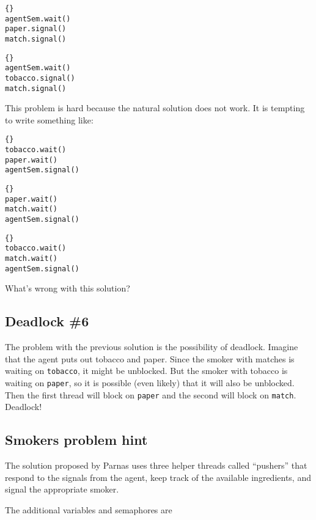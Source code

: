 \documentclass{book}
\newcommand{\clearemptydoublepage}{\newpage\cleardoublepage}
\begin{document}
\begin{lstlisting}[title={Agent B code}]{}
agentSem.wait()
paper.signal()
match.signal()
\end{lstlisting}

\begin{lstlisting}[title={Agent C code}]{}
agentSem.wait()
tobacco.signal()
match.signal()
\end{lstlisting}

This problem is hard because the natural solution does not
work.  It is tempting to write something like:

\begin{lstlisting}[title={Smoker with matches}]{}
tobacco.wait()
paper.wait()
agentSem.signal()
\end{lstlisting}

\begin{lstlisting}[title={Smoker with tobacco}]{}
paper.wait()
match.wait()
agentSem.signal()
\end{lstlisting}

\begin{lstlisting}[title={Smoker with paper}]{}
tobacco.wait()
match.wait()
agentSem.signal()
\end{lstlisting}

What's wrong with this solution?

\clearemptydoublepage
\subsection{Deadlock \#6}

The problem with the previous solution is the possibility
of deadlock.  Imagine that the agent puts out tobacco and
paper.  Since the smoker with matches is waiting on {\tt tobacco},
it might be unblocked.  But the smoker with tobacco is
waiting on {\tt paper}, so it is possible (even likely) that
it will also be unblocked.  Then the first thread will block
on {\tt paper} and the second will block on {\tt match}.
Deadlock!

\clearemptydoublepage
\subsection{Smokers problem hint}

The solution proposed by Parnas uses three helper threads
called ``pushers'' that respond to the signals from the agent,
keep track of the available ingredients, and signal the
appropriate smoker.

The additional variables and semaphores are
\end{document}
